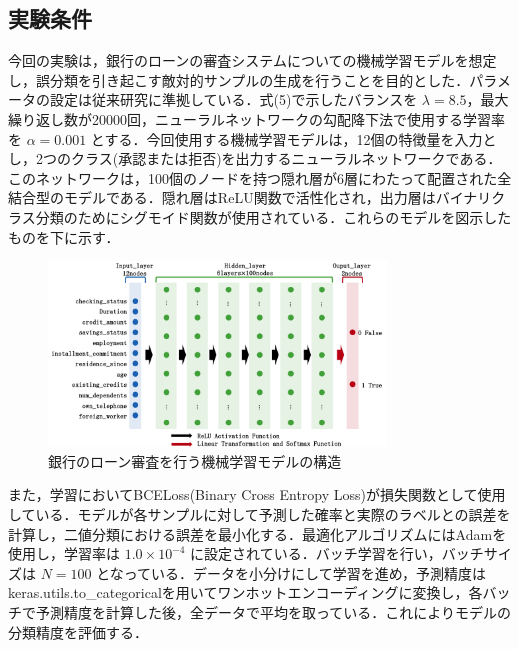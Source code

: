 \subsection{実験条件}
今回の実験は，銀行のローンの審査システムについての機械学習モデルを想定し，誤分類を引き起こす敵対的サンプルの生成を行うことを目的とした．パラメータの設定は従来研究\cite{ballet2019imperceptible}に準拠している．式(5)で示したバランスを $\lambda=8.5$，最大繰り返し数が20000回，ニューラルネットワークの勾配降下法で使用する学習率を $\alpha=0.001$ とする．今回使用する機械学習モデルは，12個の特徴量を入力とし，2つのクラス(承認または拒否)を出力するニューラルネットワークである．このネットワークは，100個のノードを持つ隠れ層が6層にわたって配置された全結合型のモデルである．隠れ層はReLU関数で活性化され，出力層はバイナリクラス分類のためにシグモイド関数が使用されている．これらのモデルを図示したものを下に示す．

\begin{figure}[H]
    \centering
    \includegraphics[width=0.8\textwidth]{images/審査モデル.png}
    \caption{銀行のローン審査を行う機械学習モデルの構造}
    \label{fig:adversarial_example}
\end{figure}

また，学習においてBCELoss(Binary Cross Entropy Loss)が損失関数として使用している．モデルが各サンプルに対して予測した確率と実際のラベルとの誤差を計算し，二値分類における誤差を最小化する．最適化アルゴリズムにはAdamを使用し，学習率は $1.0 \times 10^{-4}$ に設定されている．バッチ学習を行い，バッチサイズは $N=100$ となっている．データを小分けにして学習を進め，予測精度はkeras.utils.to\_categoricalを用いてワンホットエンコーディングに変換し，各バッチで予測精度を計算した後，全データで平均を取っている．これによりモデルの分類精度を評価する．

